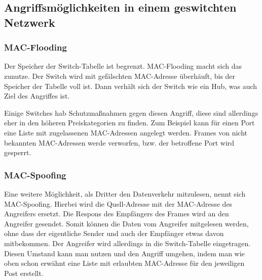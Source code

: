\subsection{Angriffsmöglichkeiten in einem geswitchten Netzwerk}
\label{sec:geswitchtes_netz}

\subsubsection{MAC-Flooding}
Der Speicher der Switch-Tabelle ist begrenzt. MAC-Flooding macht sich das zunutze. Der Switch wird mit gefälschten MAC-Adresse überhäuft, bis der Speicher der Tabelle voll ist.
Dann verhält sich der Switch wie ein Hub, was auch Ziel des Angriffes ist.

Einige Switches hab Schutzmaßnahmen gegen diesen Angriff, diese sind allerdings eher in den höheren Preiskategorien zu finden. Zum Beispiel kann für einen Port eine Liste mit zugelassenen MAC-Adressen angelegt werden. Frames von nicht bekannten MAC-Adressen werde verworfen, bzw. der betroffene Port wird gesperrt.

\subsubsection{MAC-Spoofing}
Eine weitere Möglichkeit, als Dritter den Datenverkehr mitzulesen, nennt sich MAC-Spoofing. Hierbei wird die Quell-Adresse mit der MAC-Adresse des Angreifers ersetzt. Die Respons des Empfängers des Frames wird an den Angreifer gesendet. Somit können die Daten vom Angreifer mitgelesen werden, ohne dass der eigentliche Sender und auch der Empfänger etwas davon mitbekommen. Der Angreifer wird allerdings in die Switch-Tabelle eingetragen. Diesen Umstand kann man nutzen und den Angriff umgehen, indem man wie oben schon erwähnt eine Liste mit erlaubten MAC-Adresse für den jeweiligen Post erstellt.

